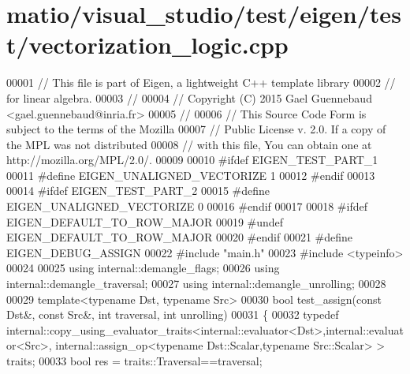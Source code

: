 \hypertarget{matio_2visual__studio_2test_2eigen_2test_2vectorization__logic_8cpp_source}{}\section{matio/visual\+\_\+studio/test/eigen/test/vectorization\+\_\+logic.cpp}
\label{matio_2visual__studio_2test_2eigen_2test_2vectorization__logic_8cpp_source}

\begin{DoxyCode}
00001 \textcolor{comment}{// This file is part of Eigen, a lightweight C++ template library}
00002 \textcolor{comment}{// for linear algebra.}
00003 \textcolor{comment}{//}
00004 \textcolor{comment}{// Copyright (C) 2015 Gael Guennebaud <gael.guennebaud@inria.fr>}
00005 \textcolor{comment}{//}
00006 \textcolor{comment}{// This Source Code Form is subject to the terms of the Mozilla}
00007 \textcolor{comment}{// Public License v. 2.0. If a copy of the MPL was not distributed}
00008 \textcolor{comment}{// with this file, You can obtain one at http://mozilla.org/MPL/2.0/.}
00009 
00010 \textcolor{preprocessor}{#ifdef EIGEN\_TEST\_PART\_1}
00011 \textcolor{preprocessor}{#define EIGEN\_UNALIGNED\_VECTORIZE 1}
00012 \textcolor{preprocessor}{#endif}
00013 
00014 \textcolor{preprocessor}{#ifdef EIGEN\_TEST\_PART\_2}
00015 \textcolor{preprocessor}{#define EIGEN\_UNALIGNED\_VECTORIZE 0}
00016 \textcolor{preprocessor}{#endif}
00017 
00018 \textcolor{preprocessor}{#ifdef EIGEN\_DEFAULT\_TO\_ROW\_MAJOR}
00019 \textcolor{preprocessor}{#undef EIGEN\_DEFAULT\_TO\_ROW\_MAJOR}
00020 \textcolor{preprocessor}{#endif}
00021 \textcolor{preprocessor}{#define EIGEN\_DEBUG\_ASSIGN}
00022 \textcolor{preprocessor}{#include "main.h"}
00023 \textcolor{preprocessor}{#include <typeinfo>}
00024 
00025 \textcolor{keyword}{using} internal::demangle\_flags;
00026 \textcolor{keyword}{using} internal::demangle\_traversal;
00027 \textcolor{keyword}{using} internal::demangle\_unrolling;
00028 
00029 \textcolor{keyword}{template}<\textcolor{keyword}{typename} Dst, \textcolor{keyword}{typename} Src>
00030 \textcolor{keywordtype}{bool} test\_assign(\textcolor{keyword}{const} Dst&, \textcolor{keyword}{const} Src&, \textcolor{keywordtype}{int} traversal, \textcolor{keywordtype}{int} unrolling)
00031 \{
00032   \textcolor{keyword}{typedef} internal::copy\_using\_evaluator\_traits<internal::evaluator<Dst>,internal::evaluator<Src>, 
      internal::assign\_op<typename Dst::Scalar,typename Src::Scalar> > traits;
00033   \textcolor{keywordtype}{bool} res = traits::Traversal==traversal;

\end{DoxyCode}
